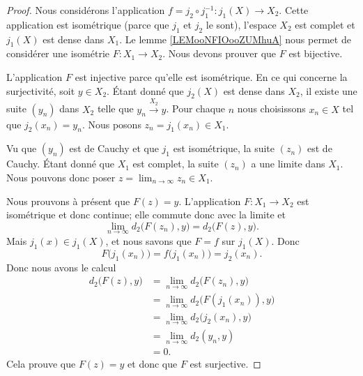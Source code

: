 \begin{proof}
	Nous considérons l'application \( f=j_2\circ j_1^{-1}\colon j_1(X)\to X_2\). Cette application est isométrique (parce que \( j_1\) et \( j_2\) le sont), l'espace \( X_2\) est complet et \( j_1(X)\) est dense dans \( X_1\). Le lemme \ref{LEMooNFIOooZUMhuA} nous permet de considérer une isométrie \( F\colon X_1\to X_2\). Nous devons prouver que \( F\) est bijective.

	L'application \( F\) est injective parce qu'elle est isométrique. En ce qui concerne la surjectivité, soit \( y\in X_2\). Étant donné que \( j_2(X)\) est dense dans \( X_2\), il existe une suite \( (y_n)\) dans \( X_2\) telle que \( y_n\stackrel{X_2}{\longrightarrow}y\). Pour chaque \( n\) nous choisissons \( x_n\in X\) tel que \( j_2(x_n)=y_n\). Nous posons \( z_n=j_1(x_n)\in X_1\).

	Vu que \( (y_n)\) est de Cauchy et que \( j_1\) est isométrique, la suite \( (z_n)\) est de Cauchy. Étant donné que \( X_1\) est complet, la suite \( (z_n)\) a une limite dans \( X_1\). Nous pouvons donc poser \( z=\lim_{n\to \infty} z_n\in X_1\).

	Nous prouvons à présent que \( F(z)=y\). L'application \( F\colon X_1\to X_2\) est isométrique et donc continue; elle commute donc avec la limite et
	\begin{equation}
		\lim_{n\to \infty} d_2\big( F(z_n),y \big)=d_2\big(F(z),y\big).
	\end{equation}
	Mais \( j_1(x)\in j_1(X)\), et nous savons que \( F=f\) sur \( j_1(X)\). Donc
	\begin{equation}
		F\big( j_1(x_n) \big)=f\big( j_1(x_n) \big)=j_2(x_n).
	\end{equation}
	Donc nous avons le calcul
	\begin{subequations}
		\begin{align}
			d_2\big( F(z),y \big) & =\lim_{n\to \infty} d_2\big( F(z_n),y \big)      \\
			                      & =\lim_{n\to \infty} d_2\big( F(j_1(x_n)),y \big) \\
			                      & =\lim_{n\to \infty} d_2\big( j_2(x_n),y \big)    \\
			                      & =\lim_{n\to \infty} d_2(y_n,y)                   \\
			                      & =0.
		\end{align}
	\end{subequations}
	Cela prouve que \( F(z)=y\) et donc que \( F\) est surjective.
\end{proof}

